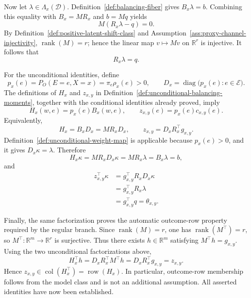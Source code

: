 Now let \(\lambda\in\Lambda_x(\mathcal D)\).  Definition~\ref{def:balancing-fiber} gives \(B_x\lambda=b\).  Combining this equality with \(B_x=MR_x\) and \(b=Mq\) yields
\[
M(R_x\lambda-q)=0.
\]
By Definition~\ref{def:positive-latent-shift-class} and Assumption~\ref{ass:proxy-channel-injectivity}, \(\operatorname{rank}(M)=r\); hence the linear map \(v\mapsto Mv\) on \(\mathbb R^r\) is injective.  It follows that
\[
R_x\lambda=q.
\]

For the unconditional identities, define
\[
p_x(e)=P_O(E=e,X=x)=\pi_e\rho_x(e)>0,
\qquad
D_x=\operatorname{diag}\bigl(p_x(e):e\in\mathcal E\bigr).
\]
The definitions of \(H_x\) and \(z_{x,y}\) in Definition~\ref{def:unconditional-balancing-moments}, together with the conditional identities already proved, imply
\[
H_x(w,e)=p_x(e)B_x(w,e),
\qquad
z_{x,y}(e)=p_x(e)c_{x,y}(e).
\]
Equivalently,
\[
H_x=B_xD_x=MR_xD_x,
\qquad
z_{x,y}=D_xR_x^{\top}g_{x,y}.
\]
Definition~\ref{def:unconditional-weight-map} is applicable because \(p_x(e)>0\), and it gives \(D_x\kappa=\lambda\).  Therefore
\[
H_x\kappa
=MR_xD_x\kappa
=MR_x\lambda
=B_x\lambda
=b,
\]
and
\[
\begin{aligned}
z_{x,y}^{\top}\kappa
&=g_{x,y}^{\top}R_xD_x\kappa\\
&=g_{x,y}^{\top}R_x\lambda\\
&=g_{x,y}^{\top}q
=\theta_{x,y}.
\end{aligned}
\]

Finally, the same factorization proves the automatic outcome-row property required by the regular branch.  Since \(\operatorname{rank}(M)=r\), one has \(\operatorname{rank}(M^{\top})=r\), so \(M^{\top}:\mathbb R^m\to\mathbb R^r\) is surjective.  Thus there exists \(h\in\mathbb R^m\) satisfying \(M^{\top}h=g_{x,y}\).  Using the two unconditional factorizations above,
\[
H_x^{\top}h
=D_xR_x^{\top}M^{\top}h
=D_xR_x^{\top}g_{x,y}
=z_{x,y}.
\]
Hence \(z_{x,y}\in\operatorname{col}(H_x^{\top})=\operatorname{row}(H_x)\).  In particular, outcome-row membership follows from the model class and is not an additional assumption.  All asserted identities have now been established.